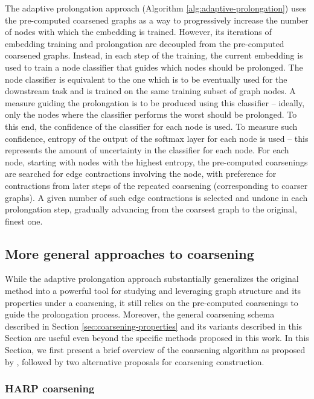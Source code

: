 The adaptive prolongation approach (Algorithm \ref{alg:adaptive-prolongation}) uses the pre-computed coarsened graphs as a way to progressively increase the number of nodes with which the embedding is trained. However, its iterations of embedding training and prolongation are decoupled from the pre-computed coarsened graphs. Instead, in each step of the training, the current embedding is used to train a node classifier that guides which nodes should be prolonged. The node classifier is equivalent to the one which is to be eventually used for the downstream task and is trained on the same training subset of graph nodes. A measure guiding the prolongation is to be produced using this classifier -- ideally, only the nodes where the classifier performs the worst should be prolonged. To this end, the confidence of the classifier for each node is used. To measure such confidence, entropy of the output of the softmax layer for each node is used -- this represents the amount of uncertainty in the classifier for each node. For each node, starting with nodes with the highest entropy, the pre-computed coarsenings are searched for edge contractions involving the node, with preference for contractions from later steps of the repeated coarsening (corresponding to coarser graphs). A given number of such edge contractions is selected and undone in each prolongation step, gradually advancing from the coarsest graph to the original, finest one.

\subsection{More general approaches to coarsening}\label{sec:coarsening-algorithms}

While the adaptive prolongation approach substantially generalizes the original method into a powerful tool for studying and leveraging graph structure and its properties under a coarsening, it still relies on the pre-computed coarsenings to guide the prolongation process. Moreover, the general coarsening schema described in Section \ref{sec:coarsening-properties} and its variants described in this Section are useful even beyond the specific methods proposed in this work. In this Section, we first present a brief overview of the coarsening algorithm as proposed by \cite{chen_harp_2018}, followed by two alternative proposals for coarsening construction.

\subsubsection{HARP coarsening}\label{sec:harp-coarsening}


